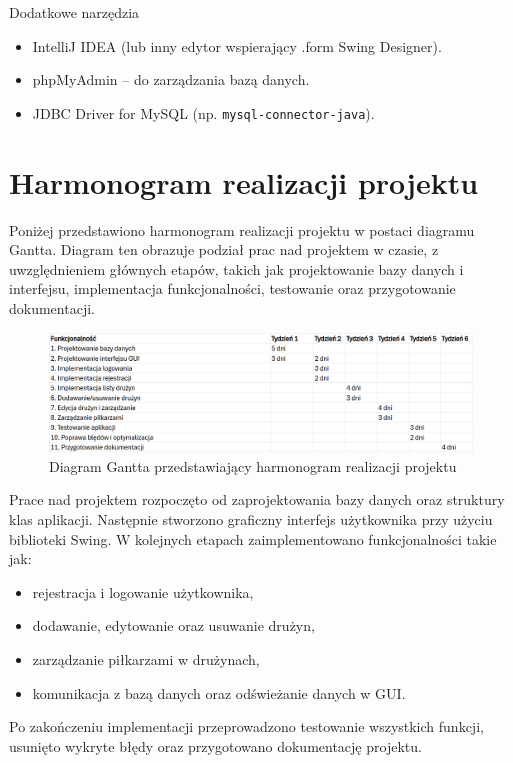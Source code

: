 \documentclass{urdpl}     %
\begin{document}
Dodatkowe narzędzia

\begin{itemize}
  \item IntelliJ IDEA (lub inny edytor wspierający .form Swing Designer).
  \item phpMyAdmin – do zarządzania bazą danych.
  \item JDBC Driver for MySQL (np. \texttt{mysql-connector-java}).
\end{itemize}

\chapter{Harmonogram realizacji projektu}\label{0}

Poniżej przedstawiono harmonogram realizacji projektu w postaci diagramu Gantta. Diagram ten obrazuje podział prac nad projektem w czasie, z uwzględnieniem głównych etapów, takich jak projektowanie bazy danych i interfejsu, implementacja funkcjonalności, testowanie oraz przygotowanie dokumentacji.

\begin{figure}[H]
    \centering
    \includegraphics[width=0.75\linewidth]{diagram.png}
    \caption{Diagram Gantta przedstawiający harmonogram realizacji projektu}
\end{figure}

Prace nad projektem rozpoczęto od zaprojektowania bazy danych oraz struktury klas aplikacji. Następnie stworzono graficzny interfejs użytkownika przy użyciu biblioteki Swing. W kolejnych etapach zaimplementowano funkcjonalności takie jak:
\begin{itemize}
    \item rejestracja i logowanie użytkownika,
    \item dodawanie, edytowanie oraz usuwanie drużyn,
    \item zarządzanie piłkarzami w drużynach,
    \item komunikacja z bazą danych oraz odświeżanie danych w GUI.
\end{itemize}

Po zakończeniu implementacji przeprowadzono testowanie wszystkich funkcji, usunięto wykryte błędy oraz przygotowano dokumentację projektu.
\end{document}
